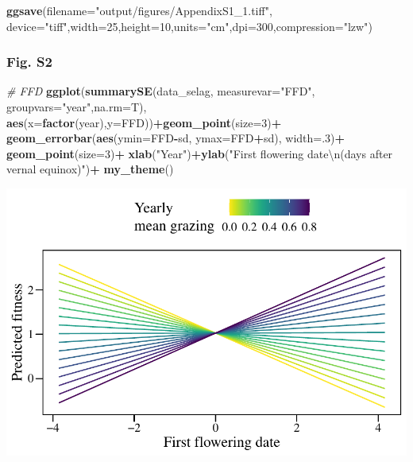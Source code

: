 \documentclass[
]{article}
\newenvironment{Shaded}{\begin{snugshade}}{\end{snugshade}}
\newcommand{\CharTok}[1]{\textcolor[rgb]{0.31,0.60,0.02}{#1}}
\newcommand{\CommentTok}[1]{\textcolor[rgb]{0.56,0.35,0.01}{\textit{#1}}}
\newcommand{\DataTypeTok}[1]{\textcolor[rgb]{0.13,0.29,0.53}{#1}}
\newcommand{\DecValTok}[1]{\textcolor[rgb]{0.00,0.00,0.81}{#1}}
\newcommand{\KeywordTok}[1]{\textcolor[rgb]{0.13,0.29,0.53}{\textbf{#1}}}
\newcommand{\NormalTok}[1]{#1}
\newcommand{\OperatorTok}[1]{\textcolor[rgb]{0.81,0.36,0.00}{\textbf{#1}}}
\newcommand{\StringTok}[1]{\textcolor[rgb]{0.31,0.60,0.02}{#1}}
\begin{document}
\begin{Shaded}
\begin{Highlighting}[]
\KeywordTok{ggsave}\NormalTok{(}\DataTypeTok{filename=}\StringTok{"output/figures/AppendixS1\_1.tiff"}\NormalTok{,}
       \DataTypeTok{device=}\StringTok{"tiff"}\NormalTok{,}\DataTypeTok{width=}\DecValTok{25}\NormalTok{,}\DataTypeTok{height=}\DecValTok{10}\NormalTok{,}\DataTypeTok{units=}\StringTok{"cm"}\NormalTok{,}\DataTypeTok{dpi=}\DecValTok{300}\NormalTok{,}\DataTypeTok{compression=}\StringTok{"lzw"}\NormalTok{)}
\end{Highlighting}
\end{Shaded}

\hypertarget{fig.-s2}{%
\subsubsection{Fig. S2}\label{fig.-s2}}

\begin{Shaded}
\begin{Highlighting}[]
\CommentTok{\# FFD}
\KeywordTok{ggplot}\NormalTok{(}\KeywordTok{summarySE}\NormalTok{(data\_selag, }\DataTypeTok{measurevar=}\StringTok{"FFD"}\NormalTok{, }\DataTypeTok{groupvars=}\StringTok{"year"}\NormalTok{,}\DataTypeTok{na.rm=}\NormalTok{T),}
       \KeywordTok{aes}\NormalTok{(}\DataTypeTok{x=}\KeywordTok{factor}\NormalTok{(year),}\DataTypeTok{y=}\NormalTok{FFD))}\OperatorTok{+}\KeywordTok{geom\_point}\NormalTok{(}\DataTypeTok{size=}\DecValTok{3}\NormalTok{)}\OperatorTok{+}
\StringTok{  }\KeywordTok{geom\_errorbar}\NormalTok{(}\KeywordTok{aes}\NormalTok{(}\DataTypeTok{ymin=}\NormalTok{FFD}\OperatorTok{{-}}\NormalTok{sd, }\DataTypeTok{ymax=}\NormalTok{FFD}\OperatorTok{+}\NormalTok{sd), }\DataTypeTok{width=}\NormalTok{.}\DecValTok{3}\NormalTok{)}\OperatorTok{+}\StringTok{ }\KeywordTok{geom\_point}\NormalTok{(}\DataTypeTok{size=}\DecValTok{3}\NormalTok{)}\OperatorTok{+}
\StringTok{  }\KeywordTok{xlab}\NormalTok{(}\StringTok{"Year"}\NormalTok{)}\OperatorTok{+}\KeywordTok{ylab}\NormalTok{(}\StringTok{"First flowering date}\CharTok{\textbackslash{}n}\StringTok{(days after vernal equinox)"}\NormalTok{)}\OperatorTok{+}
\StringTok{  }\KeywordTok{my\_theme}\NormalTok{()}
\end{Highlighting}
\end{Shaded}

\includegraphics{lathyrus_ms3_3_after_rev_Ecology_files/figure-latex/unnamed-chunk-69-1.pdf}
\end{document}

